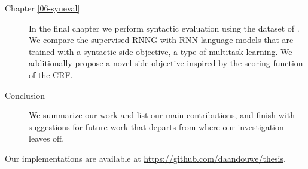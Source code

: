 \begin{description}
  \item[Chapter \ref{06-syneval}]
    In the final chapter we perform syntactic evaluation using the dataset of \citet{linzen2018targeted}. We compare the supervised RNNG with RNN language models that are trained with a syntactic side objective, a type of multitask learning. We additionally propose a novel side objective inspired by the scoring function of the CRF.

  \item[Conclusion]
    We summarize our work and list our main contributions, and finish with suggestions for future work that departs from where our investigation leaves off.

\end{description}


Our implementations are available at \url{https://github.com/daandouwe/thesis}.
